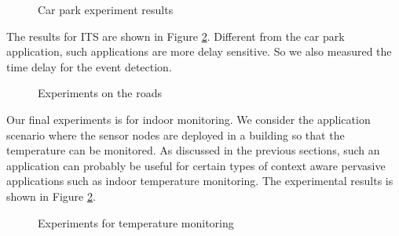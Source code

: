 \begin{figure}
\centering
{}
{}
\caption{Car park experiment results}
\label{fig:carParkResults}
\end{figure}

The results for ITS are shown in Figure \ref{fig:itsResults}. Different from the car park application, such applications are more delay sensitive. So we also measured the time delay for the event detection. %
 
\begin{figure}
\centering
{}
{}
\caption{Experiments on the roads}
\label{fig:itsResults}
\end{figure}

Our final experiments is for indoor monitoring. We consider the application scenario where the sensor nodes are deployed in a building so that the temperature can be monitored. As discussed in the previous sections, such an application can probably be useful for certain types of context aware pervasive applications such as indoor temperature monitoring. The experimental results is shown in Figure \ref{fig:itsResults}. 

\begin{figure}
\centering
{}
{}
\caption{Experiments for temperature monitoring}
\label{fig:indoorResult}
\end{figure}
